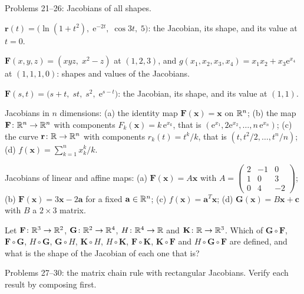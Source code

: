 Problems 21--26: Jacobians of all shapes.

\begin{problems}[resume]
  \item $\mathbf{r}(t)=\bigl(\ln(1+t^{2}),\;\mathrm{e}^{-2t},\;\cos3t,\;5\bigr)$:
        the Jacobian, its shape, and its value at $t=0$.
  \item $\mathbf{F}(x,y,z)=(xyz,\;x^{2}-z)$ at $(1,2,3)$, and
        $g(x_{1},x_{2},x_{3},x_{4})=x_{1}x_{2}+x_{3}\mathrm{e}^{x_{4}}$ at
        $(1,1,1,0)$: shapes and values of the Jacobians.
  \item $\mathbf{F}(s,t)=\bigl(s+t,\;st,\;s^{2},\;\mathrm{e}^{s-t}\bigr)$:
        the Jacobian, its shape, and its value at $(1,1)$.
  \item Jacobians in $n$ dimensions: (a) the identity map
        $\mathbf{F}(\mathbf{x})=\mathbf{x}$ on $\mathbb{R}^{n}$; (b) the map
        $\mathbf{F}\colon\mathbb{R}^{n}\to\mathbb{R}^{n}$ with components
        $F_{k}(\mathbf{x})=k\,\mathrm{e}^{x_{k}}$, that is
        $(\mathrm{e}^{x_{1}},2\mathrm{e}^{x_{2}},\ldots,n\,\mathrm{e}^{x_{n}})$;
        (c) the curve $\mathbf{r}\colon\mathbb{R}\to\mathbb{R}^{n}$ with components
        $r_{k}(t)=t^{k}/k$, that is $(t,t^{2}/2,\ldots,t^{n}/n)$; (d)
        $f(\mathbf{x})=\sum_{k=1}^{n}x_{k}^{k}/k$.
  \item Jacobians of linear and affine maps: (a) $\mathbf{F}(\mathbf{x})=
        A\mathbf{x}$ with $A=\begin{pmatrix}2&-1&0\\1&0&3\\0&4&-2
        \end{pmatrix}$; (b) $\mathbf{F}(\mathbf{x})=3\mathbf{x}-2\mathbf{a}$
        for a fixed $\mathbf{a}\in\mathbb{R}^{n}$; (c) $f(\mathbf{x})=
        \mathbf{a}^{T}\mathbf{x}$; (d) $\mathbf{G}(\mathbf{x})=B\mathbf{x}
        +\mathbf{c}$ with $B$ a $2\times3$ matrix.
  \item Let $\mathbf{F}\colon\mathbb{R}^{3}\to\mathbb{R}^{2}$, $\mathbf{G}\colon\mathbb{R}^{2}\to
        \mathbb{R}^{4}$, $H\colon\mathbb{R}^{4}\to\mathbb{R}$ and $\mathbf{K}\colon\mathbb{R}\to\mathbb{R}^{3}$.
        Which of $\mathbf{G}\circ\mathbf{F}$, $\mathbf{F}\circ\mathbf{G}$,
        $H\circ\mathbf{G}$, $\mathbf{G}\circ H$, $\mathbf{K}\circ H$,
        $H\circ\mathbf{K}$, $\mathbf{F}\circ\mathbf{K}$,
        $\mathbf{K}\circ\mathbf{F}$ and $H\circ\mathbf{G}\circ\mathbf{F}$
        are defined, and what is the shape of the Jacobian of each one that
        is?
\end{problems}

Problems 27--30: the matrix chain rule with rectangular Jacobians. Verify
each result by composing first.

